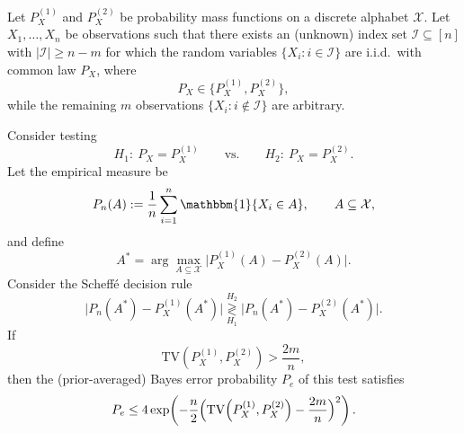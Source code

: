 \documentclass[10pt,a4paper]{amsart}
\begin{document}
\begin{lemma}\label{thm:scheffe}
Let $P_X^{(1)}$ and $P_X^{(2)}$ be probability mass functions on a discrete alphabet $\mathcal{X}$.
Let $X_1,\dots,X_n$ be observations such that there exists an (unknown) index set
$\mathcal{I}\subseteq[n]$ with $|\mathcal{I}|\ge n-m$ for which the random variables
$\{X_i:i\in\mathcal{I}\}$ are i.i.d.\ with common law $P_X$, where
\[
P_X\in\{P_X^{(1)},P_X^{(2)}\},
\]
while the remaining $m$ observations $\{X_i:i\notin\mathcal{I}\}$ are arbitrary.

Consider testing
\[
H_1:\ P_X=P_X^{(1)}
\qquad\text{vs.}\qquad
H_2:\ P_X=P_X^{(2)}.
\]
Let the empirical measure be
\[
P_n(A):=\frac{1}{n}\sum_{i=1}^n \mathbbm{1}\{X_i\in A\},\qquad A\subseteq\mathcal{X},
\]
and define
\[
A^*=\arg\max_{A\subseteq\mathcal{X}} \bigl|P_X^{(1)}(A)-P_X^{(2)}(A)\bigr|.
\]
Consider the Scheff\'e decision rule
\[
\bigl|P_n(A^*)-P_X^{(1)}(A^*)\bigr|
\underset{H_1}{\overset{H_2}{\gtrless}}
\bigl|P_n(A^*)-P_X^{(2)}(A^*)\bigr|.
\]
If
\[
\mathrm{TV}\!\left(P_X^{(1)},P_X^{(2)}\right)>\frac{2m}{n},
\]
then the (prior-averaged) Bayes error probability $P_e$ of this test satisfies
\[
P_e \le 4\exp\!\left(-\frac{n}{2}\Bigl(\mathrm{TV}\!\left(P_X^{(1)},P_X^{(2)}\right)-\frac{2m}{n}\Bigr)^2\right).
\]
\end{lemma}
\end{document}
